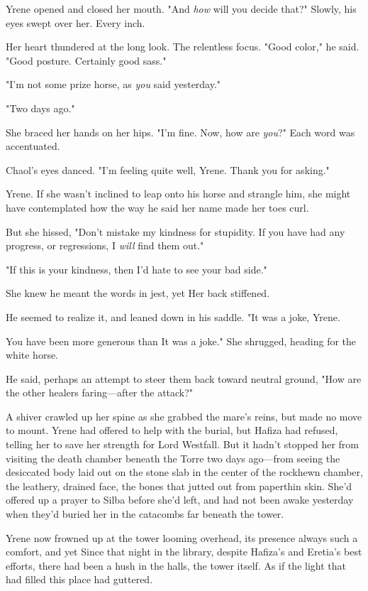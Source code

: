 Yrene opened and closed her mouth. "And \emph{how} will you decide that?" Slowly, his eyes swept over her. Every inch.

Her heart thundered at the long look. The relentless focus. "Good color," he said. "Good posture. Certainly good sass."

"I'm not some prize horse, as \emph{you} said yesterday."

"Two days ago."

She braced her hands on her hips. "I'm fine. Now, how are \emph{you}?" Each word was accentuated.

Chaol's eyes danced. "I'm feeling quite well, Yrene. Thank you for asking."

Yrene. If she wasn't inclined to leap onto his horse and strangle him, she might have contemplated how the way he said her name made her toes curl.

But she hissed, "Don't mistake my kindness for stupidity. If you have had any progress, or regressions, I \emph{will} find them out."

"If this is your kindness, then I'd hate to see your bad side."

She knew he meant the words in jest, yet  Her back stiffened.

He seemed to realize it, and leaned down in his saddle. "It was a joke, Yrene.

You have been more generous than  It was a joke." She shrugged, heading for the white horse.

He said, perhaps an attempt to steer them back toward neutral ground, "How are the other healers faring---after the attack?"

A shiver crawled up her spine as she grabbed the mare's reins, but made no move to mount. Yrene had offered to help with the burial, but Hafiza had refused, telling her to save her strength for Lord Westfall. But it hadn't stopped her from visiting the death chamber beneath the Torre two days ago---from seeing the desiccated body laid out on the stone slab in the center of the rockhewn chamber, the leathery, drained face, the bones that jutted out from paperthin skin. She'd offered up a prayer to Silba before she'd left, and had not been awake yesterday when they'd buried her in the catacombs far beneath the tower.

Yrene now frowned up at the tower looming overhead, its presence always such a comfort, and yet  Since that night in the library, despite Hafiza's and Eretia's best efforts, there had been a hush in the halls, the tower itself. As if the light that had filled this place had guttered.

